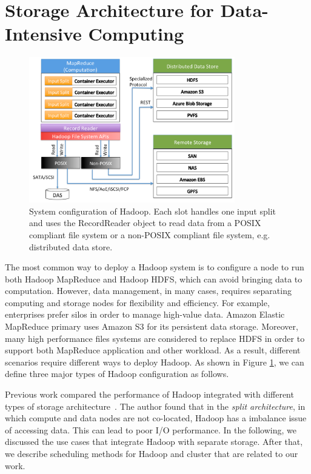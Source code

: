 \section{Storage Architecture for Data-Intensive Computing}


\begin{figure}[ht]
    \centering
    \includegraphics[width=0.8\textwidth]{figures/hadoop_model.png}
    \caption{System configuration of Hadoop.  Each slot handles one input split and uses the RecordReader object to read data from a POSIX compliant file system or a non-POSIX compliant file system, e.g. distributed data store.}
    \label{fig:hadoop_model}
\end{figure}

The most common way to deploy a Hadoop system is to configure a node to run both Hadoop MapReduce and Hadoop HDFS, which can avoid bringing data to computation.
However, data management, in many cases, requires separating computing and storage nodes for flexibility and efficiency.
For example, enterprises prefer silos in order to manage high-value data.
Amazon Elastic MapReduce primary uses Amazon S3 for its persistent data storage.
Moreover, many high performance files systems are considered to replace HDFS in order to support both MapReduce application and other workload.
As a result, different scenarios require different ways to deploy Hadoop.
As shown in Figure \ref{fig:hadoop_model}, we can define three major types of Hadoop configuration as follows.

Previous work compared the performance of Hadoop
integrated with different types of storage architecture~\cite{ShaferJ2010_PhD}.
The author found that in the \emph{split architecture},
in which compute and data nodes are not co-located,
Hadoop has a imbalance issue of accessing data.
This can lead to poor I/O performance.
In the following, we discussed the use cases that integrate Hadoop with separate storage.
After that, we describe scheduling methods for Hadoop and cluster that are related to our work.

